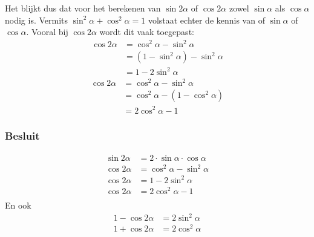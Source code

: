 \documentclass[twoside,a4paper,12pt]{article}
\begin{document}
Het blijkt dus dat voor het berekenen van $\sin 2\alpha$ of $\cos 2\alpha$ zowel $\sin\alpha$ als $\cos\alpha$
nodig is. Vermits $\sin^2\alpha + \cos^2\alpha = 1$ volstaat echter de kennis van of $\sin\alpha$ of
$\cos\alpha$. Vooral bij $\cos 2\alpha$ wordt dit vaak toegepast:
\begin{align*}
       \cos 2\alpha &= \cos^2\alpha - \sin^2\alpha\\
                    &= (1 - \sin^2\alpha) - \sin^2\alpha\\
                    &= 1 - 2\sin^2\alpha
\end{align*}
\begin{align*}
       \cos 2\alpha &= \cos^2\alpha - \sin^2\alpha\\
                    &= \cos^2\alpha - (1 - \cos^2\alpha)\\
                    &= 2\cos^2\alpha - 1
\end{align*}

\subsubsection*{Besluit}
\begin{align*}
  \sin 2\alpha &= 2\cdot\sin\alpha\cdot\cos\alpha\\
  \cos 2\alpha &= \cos^2\alpha -\sin^2\alpha\\
  \cos 2\alpha &= 1 - 2\sin^2\alpha\\
  \cos 2\alpha &= 2\cos^2\alpha - 1\\
\end{align*}
En ook
\begin{align*}
  1 - \cos 2\alpha &= 2\sin^2\alpha\\
  1 + \cos 2\alpha &= 2\cos^2\alpha \\
\end{align*}
\end{document}
